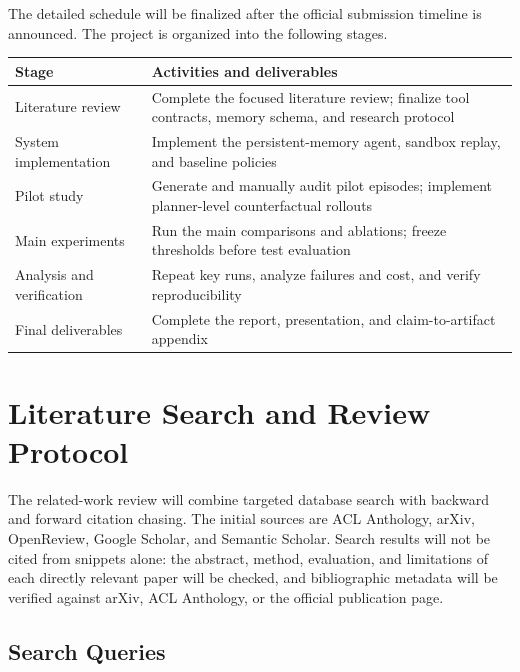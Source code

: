 \documentclass[11pt]{article}
\begin{document}
The detailed schedule will be finalized after the official submission timeline is announced. The project is organized into the following stages.

\begin{table}[h]
\centering
\small
\begin{tabularx}{\textwidth}{p{}X}
\toprule
\textbf{Stage} & \textbf{Activities and deliverables} \\
\midrule
Literature review & Complete the focused literature review; finalize tool contracts, memory schema, and research protocol \\
System implementation & Implement the persistent-memory agent, sandbox replay, and baseline policies \\
Pilot study & Generate and manually audit pilot episodes; implement planner-level counterfactual rollouts \\
Main experiments & Run the main comparisons and ablations; freeze thresholds before test evaluation \\
Analysis and verification & Repeat key runs, analyze failures and cost, and verify reproducibility \\
Final deliverables & Complete the report, presentation, and claim-to-artifact appendix \\
\bottomrule
\end{tabularx}
\end{table}

\appendix
\section{Literature Search and Review Protocol}
\label{app:literature}

The related-work review will combine targeted database search with backward and forward citation chasing. The initial sources are ACL Anthology, arXiv, OpenReview, Google Scholar, and Semantic Scholar. Search results will not be cited from snippets alone: the abstract, method, evaluation, and limitations of each directly relevant paper will be checked, and bibliographic metadata will be verified against arXiv, ACL Anthology, or the official publication page.

\subsection{Search Queries}
\end{document}
